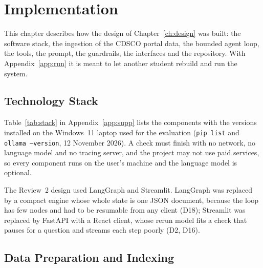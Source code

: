 \chapter{Implementation}
\label{ch:impl}
\sloppy

This chapter describes how the design of Chapter~\ref{ch:design} was built: the software stack, the ingestion of the CDSCO portal data, the bounded agent loop, the tools, the prompt, the guardrails, the interfaces and the repository. With Appendix~\ref{app:run} it is meant to let another student rebuild and run the system.

\section{Technology Stack}
\label{sec:impl-technology-stack}

Table~\ref{tab:stack} in Appendix~\ref{app:supp} lists the components with the versions installed on the Windows~11 laptop used for the evaluation (\texttt{pip list} and \texttt{ollama --version}, 12 November 2026). A check must finish with no network, no language model and no tracing server, and the project may not use paid services, so every component runs on the user's machine and the language model is optional.

The Review~2 design used LangGraph and Streamlit. LangGraph was replaced by a compact engine whose whole state is one JSON document, because the loop has few nodes and had to be resumable from any client (D18); Streamlit was replaced by FastAPI with a React client, whose rerun model fits a check that pauses for a question and streams each step poorly (D2, D16).

\section{Data Preparation and Indexing}
\label{sec:impl-data-preparation-and-indexing}

